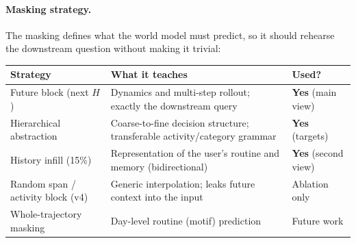 \documentclass[10.5pt]{article}
\begin{document}
\paragraph{Masking strategy.} The masking defines what the world model must predict, so it should rehearse the
downstream question without making it trivial:
\begin{center}\small
\begin{tabularx}{\linewidth}{>{\raggedright\arraybackslash}p{3.3cm}X>{\raggedright\arraybackslash}p{2.6cm}}
\toprule
Strategy & What it teaches & Used? \\
\midrule
Future block (next $H$) & Dynamics and multi-step rollout; exactly the downstream query & \textbf{Yes} (main view) \\
Hierarchical abstraction & Coarse-to-fine decision structure; transferable activity/category grammar & \textbf{Yes} (targets) \\
History infill (15\%) & Representation of the user's routine and memory (bidirectional) & \textbf{Yes} (second view) \\
Random span / activity block (v4) & Generic interpolation; leaks future context into the input & Ablation only \\
Whole-trajectory masking & Day-level routine (motif) prediction & Future work \\
\bottomrule
\end{tabularx}
\end{center}
\end{document}
